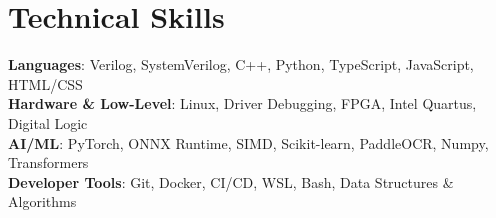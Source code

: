 \documentclass[letterpaper,11pt]{article}
\begin{document}
\section{Technical Skills}
 \begin{itemize}[leftmargin=0.15in, label={}]
    \small{\item{
     \textbf{Languages}{: Verilog, SystemVerilog, C++, Python, TypeScript, JavaScript, HTML/CSS} \\
     \textbf{Hardware \& Low-Level}{: Linux, Driver Debugging, FPGA, Intel Quartus, Digital Logic} \\
     \textbf{AI/ML}{: PyTorch, ONNX Runtime, SIMD, Scikit-learn, PaddleOCR, Numpy, Transformers} \\
     \textbf{Developer Tools}{: Git, Docker, CI/CD, WSL, Bash, Data Structures \& Algorithms} \\
    }}
 \end{itemize}

\end{document}
